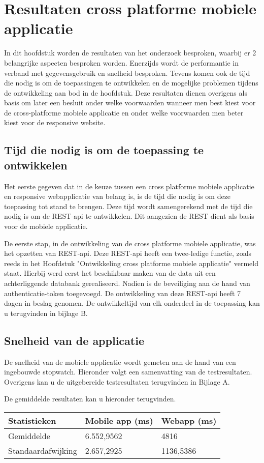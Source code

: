 \chapter{Resultaten cross platforme mobiele applicatie}
\label{ch:resultatencrossplatformapp}
In dit hoofdstuk worden de resultaten van het onderzoek besproken, waarbij er 2 belangrijke
aspecten besproken worden.
Enerzijds wordt de performantie in verband met gegevensgebruik en  snelheid besproken.
Tevens komen ook de tijd die nodig is om de toepassingen te ontwikkelen en de mogelijke
problemen tijdens de ontwikkeling aan bod in de hoofdstuk.
Deze resultaten dienen overigens als basis om later een besluit onder welke
voorwaarden wanneer men best kiest voor de
cross-platforme mobiele applicatie en onder welke voorwaarden men beter kiest voor de responsive website.

\section{Tijd die nodig is om de toepassing te ontwikkelen}
Het eerste gegeven dat in de keuze tussen een cross platforme mobiele
applicatie en responsive webapplicatie van belang is,
is de tijd die nodig is om deze toepassing tot stand te brengen.
Deze tijd wordt samengerekend met de tijd die nodig is om de
REST-api te ontwikkelen. Dit aangezien de REST dient als basis voor de mobiele applicatie.

De eerste stap, in de ontwikkeling van de cross platforme mobiele applicatie, was het opzetten van REST-api.
Deze REST-api heeft een twee-ledige functie, zoals reeds in het Hoofdstuk "Ontwikkeling cross platforme mobiele applicatie" vermeld staat.
Hierbij werd eerst het beschikbaar maken van de data uit een achterliggende databank gerealiseerd. Nadien is de beveiliging aan de hand
van authenticatie-token toegevoegd. De ontwikkeling van deze REST-api heeft 7 dagen in beslag genomen. De ontwikkeltijd van elk onderdeel
in de toepassing kan u terugvinden in bijlage B.

\section{Snelheid van de applicatie}
De snelheid van de mobiele applicatie wordt gemeten aan de hand van een ingebouwde stopwatch.
Hieronder volgt een samenvatting van de testresultaten. Overigens kan u de uitgebereide testresultaten terugvinden in Bijlage A.

De gemiddelde resultaten kan u hieronder terugvinden.
\begin{center}
\begin{tabular}{| l | l | l | }
  \hline
  Statistieken & Mobile app (ms) & Webapp (ms) \\ \hline
  Gemiddelde & 6.552,9562 & 4816 \\ \hline
  Standaardafwijking & 2.657,2925 & 1136,5386 \\
  \hline
\end{tabular}
\end{center}
